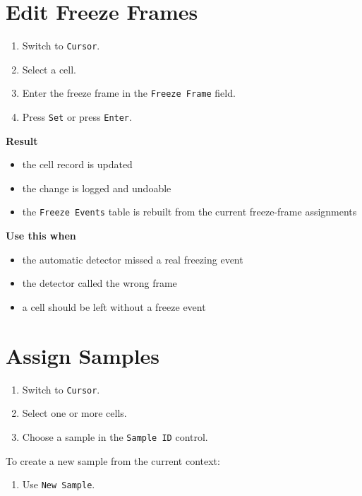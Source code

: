 \documentclass[
  9pt,
  letterpaper,
  oneside,
  open=any,
  DIV=15,
  parskip=half-,
  headings=big,
  numbers=noenddot
]{scrbook}
\newcommand{\manuallead}[1]{%
  \vspace{0.15em}%
  {\sffamily\bfseries\color{ManualBlue}#1}\par\nobreak\vspace{0.05em}%
}
\begin{document}
\section{Edit Freeze Frames}

\begin{enumerate}[leftmargin=*,itemsep=0.35em,topsep=0.4em]
\item Switch to \texttt{Cursor}.
\item Select a cell.
\item Enter the freeze frame in the \texttt{Freeze Frame} field.
\item Press \texttt{Set} or press \texttt{Enter}.
\end{enumerate}

\manuallead{Result}

\begin{itemize}[leftmargin=*,itemsep=0.35em,topsep=0.4em]
\item the cell record is updated
\item the change is logged and undoable
\item the \texttt{Freeze Events} table is rebuilt from the current freeze-frame assignments
\end{itemize}

\manuallead{Use this when}

\begin{itemize}[leftmargin=*,itemsep=0.35em,topsep=0.4em]
\item the automatic detector missed a real freezing event
\item the detector called the wrong frame
\item a cell should be left without a freeze event
\end{itemize}

\section{Assign Samples}

\begin{enumerate}[leftmargin=*,itemsep=0.35em,topsep=0.4em]
\item Switch to \texttt{Cursor}.
\item Select one or more cells.
\item Choose a sample in the \texttt{Sample ID} control.
\end{enumerate}

To create a new sample from the current context:


\begin{enumerate}[leftmargin=*,itemsep=0.35em,topsep=0.4em]
\item Use \texttt{New Sample}.
\end{enumerate}
\end{document}
